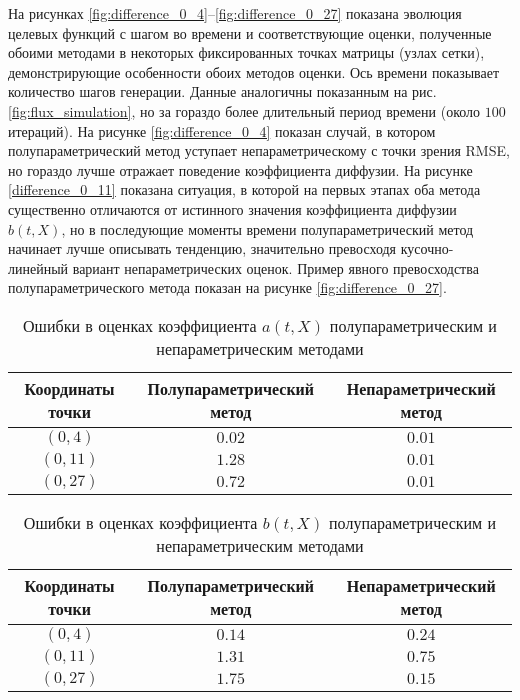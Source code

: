 На рисунках \ref{fig:difference_0_4}--\ref{fig:difference_0_27} показана эволюция целевых функций с шагом во времени и соответствующие оценки, полученные обоими методами в некоторых фиксированных точках матрицы (узлах сетки), демонстрирующие особенности обоих методов оценки. Ось времени показывает количество шагов генерации. Данные аналогичны показанным на рис. \ref{fig:flux_simulation}, но за гораздо более длительный период времени (около $100$ итераций).
На рисунке \ref{fig:difference_0_4} показан случай, в котором полупараметрический метод уступает непараметрическому с точки зрения RMSE, но гораздо лучше отражает поведение коэффициента диффузии. На рисунке \ref{difference_0_11} показана ситуация, в которой на первых этапах оба метода существенно отличаются от истинного значения коэффициента диффузии $b(t,X)$, но в последующие моменты времени полупараметрический метод начинает лучше описывать тенденцию, значительно превосходя кусочно-линейный вариант непараметрических оценок. Пример явного превосходства полупараметрического метода показан на рисунке \ref{fig:difference_0_27}.

\begin{table}[h!]
	\centering
	\caption{Ошибки в оценках коэффициента $a(t,X)$ полупараметрическим и непараметрическим методами}
	\begin{tabular}{|c|c|c|}
		\hline
		Координаты точки & Полупараметрический метод & Непараметрический метод \\
		\hline
		$(0, 4)$ & $0.02$ & $0.01$ \\
		$(0, 11)$ & $1.28$ & $0.01$ \\
		$(0, 27)$ & $0.72$ & $0.01$ \\
		\hline
	\end{tabular}
	\label{tab:errors_estimation_a}
\end{table}

\begin{table}[h!]
	\centering
	\caption{Ошибки в оценках коэффициента $b(t,X)$ полупараметрическим и непараметрическим методами}
	\begin{tabular}{|c|c|c|}
		\hline
		Координаты точки & Полупараметрический метод & Непараметрический метод \\
		\hline
		$(0, 4)$ & $0.14$ & $0.24$ \\
		$(0, 11)$ & $1.31$ & $0.75$ \\
		$(0, 27)$ & $1.75$ & $0.15$ \\
		\hline
	\end{tabular}
	\label{tab:errors_estimation_b}
\end{table}

